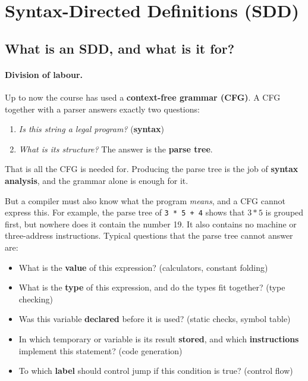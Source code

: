\documentclass[11pt,a4paper]{article}
\begin{document}
\section{Syntax-Directed Definitions (SDD)}

\subsection{What is an SDD, and what is it for?}
\label{sec:sddwhat}

\paragraph{Division of labour.} Up to now the course has used a \textbf{context-free grammar (CFG)}. A CFG together with a parser answers exactly two questions:
\begin{enumerate}[nosep]
\item \emph{Is this string a legal program?} (\textbf{syntax})
\item \emph{What is its structure?} The answer is the \textbf{parse tree}.
\end{enumerate}
That is all the CFG is needed for. Producing the parse tree is the job of \textbf{syntax analysis}, and the grammar alone is enough for it.

But a compiler must also know what the program \emph{means}, and a CFG cannot express this. For example, the parse tree of \texttt{3 * 5 + 4} shows that $3*5$ is grouped first, but nowhere does it contain the number 19. It also contains no machine or three-address instructions. Typical questions that the parse tree cannot answer are:
\begin{itemize}[nosep]
\item What is the \textbf{value} of this expression? \hfill (calculators, constant folding)
\item What is the \textbf{type} of this expression, and do the types fit together? \hfill (type checking)
\item Was this variable \textbf{declared} before it is used? \hfill (static checks, symbol table)
\item In which temporary or variable is its result \textbf{stored}, and which \textbf{instructions} implement this statement? \hfill (code generation)
\item To which \textbf{label} should control jump if this condition is true? \hfill (control flow)
\end{itemize}
\end{document}
